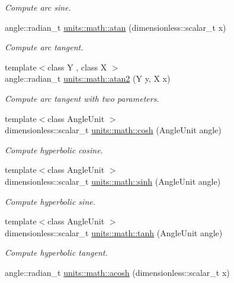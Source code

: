 \begin{DoxyCompactItemize}
\begin{DoxyCompactList}\small\item\em Compute arc sine. \end{DoxyCompactList}\item 
angle\+::radian\+\_\+t \hyperlink{group___unit_math_ga8d82edb60d8f0ab9efc2f7581457bb3e}{units\+::math\+::atan} (dimensionless\+::scalar\+\_\+t x)
\begin{DoxyCompactList}\small\item\em Compute arc tangent. \end{DoxyCompactList}\item 
{\footnotesize template$<$class Y , class X $>$ }\\angle\+::radian\+\_\+t \hyperlink{group___unit_math_ga888f6c083879b6892faf6ab73f8fc9a1}{units\+::math\+::atan2} (Y y, X x)
\begin{DoxyCompactList}\small\item\em Compute arc tangent with two parameters. \end{DoxyCompactList}\item 
{\footnotesize template$<$class Angle\+Unit $>$ }\\dimensionless\+::scalar\+\_\+t \hyperlink{group___unit_math_gad2f3a2b64b638d499d840a933774422b}{units\+::math\+::cosh} (Angle\+Unit angle)
\begin{DoxyCompactList}\small\item\em Compute hyperbolic cosine. \end{DoxyCompactList}\item 
{\footnotesize template$<$class Angle\+Unit $>$ }\\dimensionless\+::scalar\+\_\+t \hyperlink{group___unit_math_ga7650a253c6b431cd5abda645bd3897a3}{units\+::math\+::sinh} (Angle\+Unit angle)
\begin{DoxyCompactList}\small\item\em Compute hyperbolic sine. \end{DoxyCompactList}\item 
{\footnotesize template$<$class Angle\+Unit $>$ }\\dimensionless\+::scalar\+\_\+t \hyperlink{group___unit_math_ga3b2fce115a3d819ba7f51aa189838b73}{units\+::math\+::tanh} (Angle\+Unit angle)
\begin{DoxyCompactList}\small\item\em Compute hyperbolic tangent. \end{DoxyCompactList}\item 
angle\+::radian\+\_\+t \hyperlink{group___unit_math_ga928dd73a4b74f453046147c6979628eb}{units\+::math\+::acosh} (dimensionless\+::scalar\+\_\+t x)

\end{DoxyCompactItemize}
